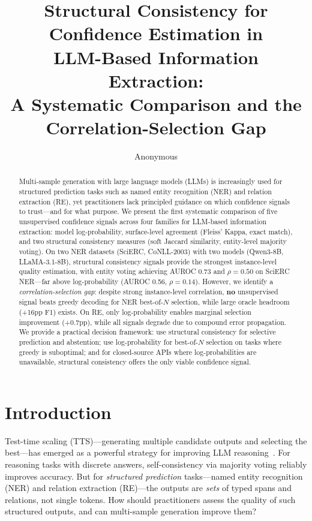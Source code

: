 \documentclass[11pt,a4paper]{article}
\title{Structural Consistency for Confidence Estimation in\\LLM-Based Information Extraction:\\A Systematic Comparison and the Correlation-Selection Gap}
\author{Anonymous}
\begin{document}
\maketitle

\begin{abstract}
Multi-sample generation with large language models (LLMs) is increasingly used for structured prediction tasks such as named entity recognition (NER) and relation extraction (RE), yet practitioners lack principled guidance on which confidence signals to trust---and for what purpose.
We present the first systematic comparison of five unsupervised confidence signals across four families for LLM-based information extraction: model log-probability, surface-level agreement (Fleiss' Kappa, exact match), and two structural consistency measures (soft Jaccard similarity, entity-level majority voting).
On two NER datasets (SciERC, CoNLL-2003) with two models (Qwen3-8B, LLaMA-3.1-8B), structural consistency signals provide the strongest instance-level quality estimation, with entity voting achieving AUROC 0.73 and $\rho{=}0.50$ on SciERC NER---far above log-probability (AUROC 0.56, $\rho{=}0.14$).
However, we identify a \emph{correlation-selection gap}: despite strong instance-level correlation, \textbf{no} unsupervised signal beats greedy decoding for NER best-of-$N$ selection, while large oracle headroom (+16pp F1) exists.
On RE, only log-probability enables marginal selection improvement (+0.7pp), while all signals degrade due to compound error propagation.
We provide a practical decision framework: use structural consistency for selective prediction and abstention; use log-probability for best-of-$N$ selection on tasks where greedy is suboptimal; and for closed-source APIs where log-probabilities are unavailable, structural consistency offers the only viable confidence signal.
\end{abstract}

\section{Introduction}
\label{sec:intro}

Test-time scaling (TTS)---generating multiple candidate outputs and selecting the best---has emerged as a powerful strategy for improving LLM reasoning~\cite{wang2023selfconsistency,snell2024scaling,brown2024large}.
For reasoning tasks with discrete answers, self-consistency via majority voting reliably improves accuracy.
But for \emph{structured prediction} tasks---named entity recognition (NER) and relation extraction (RE)---the outputs are \emph{sets} of typed spans and relations, not single tokens.
How should practitioners assess the quality of such structured outputs, and can multi-sample generation improve them?
\end{document}
